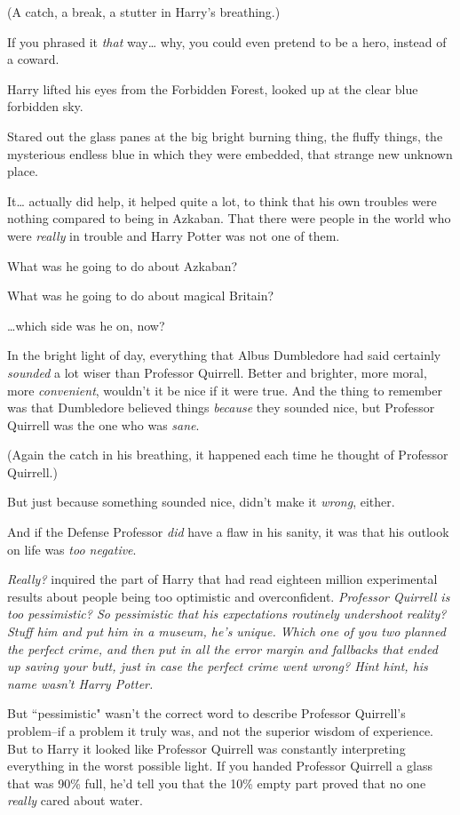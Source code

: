 (A catch, a break, a stutter in Harry's breathing.)

If you phrased it \emph{that} way{\ldots} why, you could even pretend to be a hero, instead of a coward.

Harry lifted his eyes from the Forbidden Forest, looked up at the clear blue forbidden sky.

Stared out the glass panes at the big bright burning thing, the fluffy things, the mysterious endless blue in which they were embedded, that strange new unknown place.

It{\ldots} actually did help, it helped quite a lot, to think that his own troubles were nothing compared to being in Azkaban. That there were people in the world who were \emph{really} in trouble and Harry Potter was not one of them.

What was he going to do about Azkaban?

What was he going to do about magical Britain?

{\ldots}which side was he on, now?

In the bright light of day, everything that Albus Dumbledore had said certainly \emph{sounded} a lot wiser than Professor Quirrell. Better and brighter, more moral, more \emph{convenient}, wouldn't it be nice if it were true. And the thing to remember was that Dumbledore believed things \emph{because} they sounded nice, but Professor Quirrell was the one who was \emph{sane}.

(Again the catch in his breathing, it happened each time he thought of Professor Quirrell.)

But just because something sounded nice, didn't make it \emph{wrong}, either.

And if the Defense Professor \emph{did} have a flaw in his sanity, it was that his outlook on life was \emph{too negative}.

\emph{Really?} inquired the part of Harry that had read eighteen million experimental results about people being too optimistic and overconfident. \emph{Professor Quirrell is too pessimistic? So pessimistic that his expectations routinely \emph{undershoot} reality? Stuff him and put him in a museum, he's unique. Which one of you two planned the perfect crime, and \emph{then} put in all the error margin and fallbacks that ended up saving your butt, \emph{just in case} the perfect crime went wrong? Hint hint, his name wasn't Harry Potter.}

But ``pessimistic" wasn't the correct word to describe Professor Quirrell's problem\---if a problem it truly was, and not the superior wisdom of experience. But to Harry it looked like Professor Quirrell was constantly interpreting everything in the worst possible light. If you handed Professor Quirrell a glass that was 90\% full, he'd tell you that the 10\% empty part proved that no one \emph{really} cared about water.

